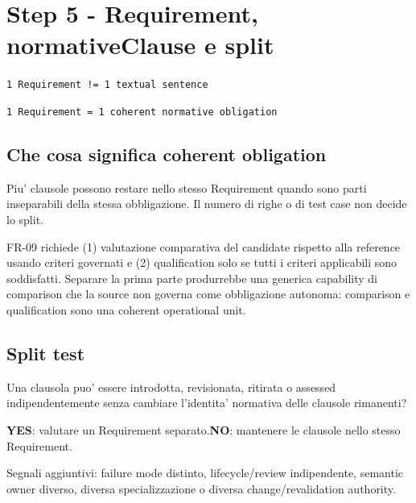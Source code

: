 \documentclass[11pt,a4paper]{article}
\begin{document}
\section{Step 5 - Requirement, normativeClause e split}
\closedtag

\begin{ddtacore}
\texttt{1 Requirement != 1 textual sentence}\par
\texttt{1 Requirement  = 1 coherent normative obligation}
\end{ddtacore}

\subsection{Che cosa significa coherent obligation}

Piu' clausole possono restare nello stesso Requirement quando sono parti inseparabili della stessa obbligazione. Il numero di righe o di test case non decide lo split.

\begin{ddtaexample}[title={Negative control - DermaTriage FR-09 non si divide}]
FR-09 richiede (1) valutazione comparativa del candidate rispetto alla reference usando criteri governati e (2) qualification solo se tutti i criteri applicabili sono soddisfatti. Separare la prima parte produrrebbe una generica capability di comparison che la source non governa come obbligazione autonoma: comparison e qualification sono una coherent operational unit.
\end{ddtaexample}

\subsection{Split test}

\begin{ddtacheck}
Una clausola puo' essere introdotta, revisionata, ritirata o assessed indipendentemente senza cambiare l'identita' normativa delle clausole rimanenti?\par
\textbf{YES}: valutare un Requirement separato.\quad \textbf{NO}: mantenere le clausole nello stesso Requirement.
\end{ddtacheck}

Segnali aggiuntivi: failure mode distinto, lifecycle/review indipendente, semantic owner diverso, diversa specializzazione o diversa change/revalidation authority.
\end{document}
